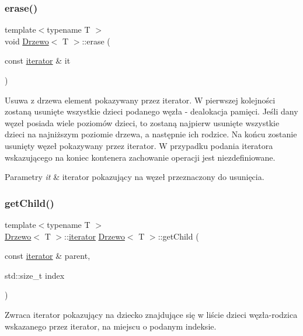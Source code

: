 \subsubsection{\texorpdfstring{erase()}{erase()}}
{\footnotesize\ttfamily template$<$typename T $>$ \\
void \hyperlink{class_drzewo}{Drzewo}$<$ T $>$\+::erase (\begin{DoxyParamCaption}\item[{const \hyperlink{class_drzewo_1_1iterator}{iterator} \&}]{it }\end{DoxyParamCaption})}

Usuwa z drzewa element pokazywany przez iterator. W pierwszej kolejności zostaną usunięte wszystkie dzieci podanego węzła -\/ dealokacja pamięci. Jeśli dany węzeł posiada wiele poziomów dzieci, to zostaną najpierw usunięte wszystkie dzieci na najniższym poziomie drzewa, a następnie ich rodzice. Na końcu zostanie usunięty węzeł pokazywany przez iterator. W przypadku podania iteratora wskazującego na koniec kontenera zachowanie operacji jest niezdefiniowane.


\begin{DoxyParams}{Parametry}
{\em it} & iterator pokazujący na węzeł przeznaczony do usunięcia. \\
\hline
\end{DoxyParams}
\mbox{\label{class_drzewo_ae45271ae9e1b1071d56c87df7eb37cad}} 
\subsubsection{\texorpdfstring{get\+Child()}{getChild()}}
{\footnotesize\ttfamily template$<$typename T $>$ \\
\hyperlink{class_drzewo}{Drzewo}$<$ T $>$\+::\hyperlink{class_drzewo_1_1iterator}{iterator} \hyperlink{class_drzewo}{Drzewo}$<$ T $>$\+::get\+Child (\begin{DoxyParamCaption}\item[{const \hyperlink{class_drzewo_1_1iterator}{iterator} \&}]{parent,  }\item[{std\+::size\+\_\+t}]{index }\end{DoxyParamCaption})\hspace{0.3cm}{\ttfamily [inline]}}

Zwraca iterator pokazujący na dziecko znajdujące się w liście dzieci węzła-\/rodzica wskazanego przez iterator, na miejscu o podanym indeksie.

